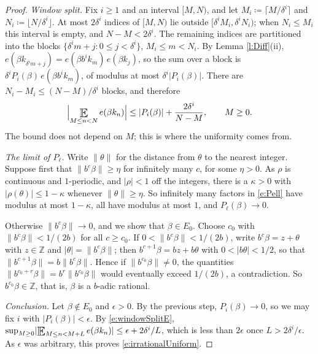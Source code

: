 \begin{proof}
\emph{Window split.}  Fix $i \geq 1$ and an interval $[M,N)$, and let $M_i \coloneqq \lceil M/\delta ^{i}\rceil$ and $N_i \coloneqq \lfloor N/\delta ^{i}\rfloor$.  
At most $2\delta ^{i}$ indices of $[M,N)$ lie outside $[\delta ^{i}M_i, \delta ^{i}N_i)$; when $N_i \leq M_i$ this interval is empty, and $N-M < 2\delta ^{i}$.  
The remaining indices are partitioned into the blocks $\{\delta ^{i}m + j \colon 0 \leq j < \delta ^{i}\}$, $M_i \leq m < N_i$.  
By Lemma \ref{l:Diff}(ii), $e(\beta k_{\delta ^{i}m+j}) = e(\beta b ^{i}k_m)\, e(\beta k_j)$, so the sum over a block is $\delta ^{i}P_i(\beta)\, e(\beta b ^{i}k_m)$, of modulus at most $\delta ^{i}\lvert P_i(\beta)\rvert$.  
There are $N_i - M_i \leq (N-M)/\delta ^{i}$ blocks, and therefore 
\begin{equation} \label{e:windowSplitE}
\Bigl\lvert \Expectation_{M\leq n<N} e(\beta k_n) \Bigr\rvert \leq \lvert P_i(\beta)\rvert + \frac{2\delta ^{i}}{N-M} , \qquad M \geq 0 . 
\end{equation}
The bound does not depend on $M$; this is where the uniformity comes from.  

\emph{The limit of $P_\ell$.}  Write $\lVert \theta\rVert$ for the distance from $\theta$ to the nearest integer.  
Suppose first that $\lVert b ^{c}\beta\rVert \geq \eta$ for infinitely many $c$, for some $\eta>0$.  
As $\rho$ is continuous and $1$-periodic, and $\lvert \rho\rvert <1$ off the integers, there is a $\kappa>0$ with $\lvert \rho (\theta)\rvert \leq 1-\kappa$ whenever $\lVert \theta\rVert \geq \eta$.  
So infinitely many factors in \eqref{e:Pell} have modulus at most $1-\kappa$, all have modulus at most $1$, and $P_\ell(\beta) \to 0$.  

Otherwise $\lVert b ^{c}\beta\rVert \to 0$, and we show that $\beta \in E_0$.  Choose $c_0$ with $\lVert b ^{c}\beta\rVert < 1/(2b)$ for all $c \geq c_0$.  
If $0 < \lVert b ^{c}\beta\rVert < 1/(2b)$, write $b ^{c}\beta = z + \theta$ with $z \in \mathbb Z$ and $\lvert \theta\rvert = \lVert b ^{c}\beta\rVert$; 
then $b ^{c+1}\beta = bz + b\theta$ with $0<\lvert b\theta\rvert < 1/2$, so that $\lVert b ^{c+1}\beta\rVert = b \lVert b ^{c}\beta\rVert$.  
Hence if $\lVert b ^{c_0}\beta\rVert \neq 0$, the quantities $\lVert b ^{c_0+r}\beta\rVert = b ^{r}\lVert b ^{c_0}\beta\rVert$ would eventually exceed $1/(2b)$, a contradiction.  
So $b ^{c_0}\beta \in \mathbb Z$, that is, $\beta$ is a $b$-adic rational.  

\emph{Conclusion.}  Let $\beta \notin E_0$ and $\epsilon > 0$.  By the previous step, $P_i(\beta) \to 0$, so we may fix $i$ with $\lvert P_i(\beta)\rvert < \epsilon$.  
By \eqref{e:windowSplitE}, $\sup_{M\geq 0}\lvert \Expectation_{M\leq n<M+L} e(\beta k_n)\rvert \leq \epsilon + 2\delta ^{i}/L$, which is less than $2\epsilon$ once $L > 2\delta ^{i}/\epsilon$.  
As $\epsilon$ was arbitrary, this proves \eqref{e:irrationalUniform}.  
\end{proof}




